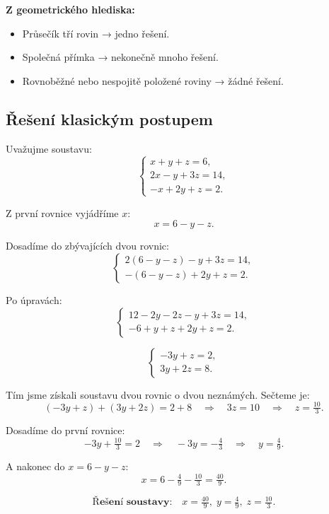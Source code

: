 \documentclass[12pt,a4paper]{article}
\begin{document}
\begin{notebox}
\textbf{Z geometrického hlediska:}
\begin{itemize}
  \item Průsečík tří rovin → jedno řešení.
  \item Společná přímka → nekonečně mnoho řešení.
  \item Rovnoběžné nebo nespojitě položené roviny → žádné řešení.
\end{itemize}
\end{notebox}


\newpage
\subsection{Řešení klasickým postupem}

Uvažujme soustavu:
\[
\begin{cases}
x + y + z = 6,\\
2x - y + 3z = 14,\\
-x + 2y + z = 2.
\end{cases}
\]

Z první rovnice vyjádříme \(x\):
\[
x = 6 - y - z.
\]

Dosadíme do zbývajících dvou rovnic:
\[
\begin{cases}
2(6 - y - z) - y + 3z = 14,\\
-(6 - y - z) + 2y + z = 2.
\end{cases}
\]

Po úpravách:
\[
\begin{cases}
12 - 2y - 2z - y + 3z = 14,\\
-6 + y + z + 2y + z = 2.
\end{cases}
\]

\[
\begin{cases}
-3y + z = 2,\\
3y + 2z = 8.
\end{cases}
\]

Tím jsme získali soustavu dvou rovnic o dvou neznámých.  
Sečteme je:
\[
(-3y + z) + (3y + 2z) = 2 + 8 \quad \Rightarrow \quad 3z = 10 \quad \Rightarrow \quad z = \tfrac{10}{3}.
\]

Dosadíme do první rovnice:
\[
-3y + \tfrac{10}{3} = 2 \quad \Rightarrow \quad -3y = -\tfrac{4}{3} \quad \Rightarrow \quad y = \tfrac{4}{9}.
\]

A nakonec do \(x = 6 - y - z\):
\[
x = 6 - \tfrac{4}{9} - \tfrac{10}{3} = \tfrac{40}{9}.
\]

\[
\textbf{Řešení soustavy:} \quad x = \tfrac{40}{9},\; y = \tfrac{4}{9},\; z = \tfrac{10}{3}.
\]
\end{document}
